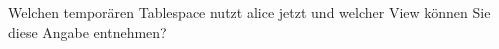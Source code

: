     \item Welchen tempor\"aren Tablespace nutzt alice jetzt und welcher View k\"onnen Sie diese Angabe entnehmen?
